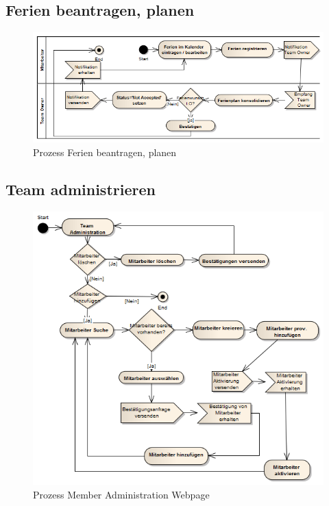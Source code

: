 \subsection{Ferien beantragen, planen}
 \begin{figure}[H]
  	\centering
    	\includegraphics[width=15cm]{images/process_vacation}
 	\caption{Prozess Ferien beantragen, planen}
\end{figure}


\subsection{Team administrieren}
 \begin{figure}[H]
  	\centering
    	\includegraphics[width=15cm]{images/process_team_administration}
 	\caption{Prozess Member Administration Webpage}
\end{figure}


